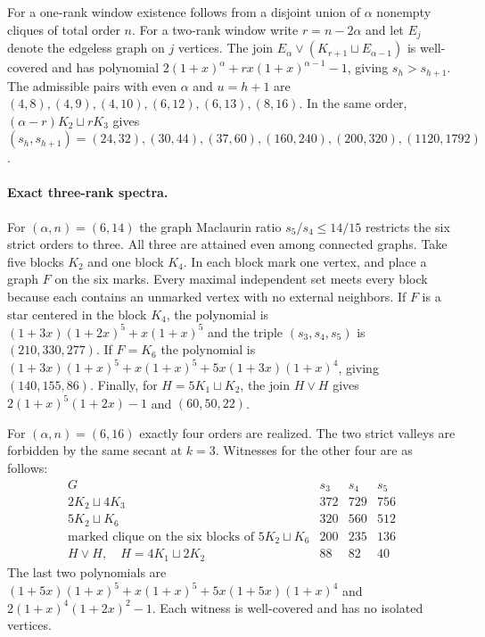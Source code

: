 \documentclass[11pt,a4paper]{article}
\theoremstyle{remark}\newtheorem{remark}[theorem]{Remark}
\numberwithin{equation}{section}
\begin{document}
For a one-rank window existence follows from a disjoint union of $\alpha$
nonempty cliques of total order $n$. For a two-rank window write
$r=n-2\alpha$ and let $E_j$ denote the edgeless graph on $j$ vertices.
The join $E_\alpha\vee (K_{r+1}\sqcup E_{\alpha-1})$ is well-covered and has
polynomial $2(1+x)^\alpha+rx(1+x)^{\alpha-1}-1$, giving $s_h>s_{h+1}$.
The admissible pairs with even $\alpha$ and $u=h+1$ are
$(4,8),(4,9),(4,10),(6,12),(6,13),(8,16)$. In the same order,
$(\alpha-r)K_2\sqcup rK_3$ gives
$(s_h,s_{h+1})=(24,32),(30,44),(37,60),(160,240),(200,320),(1120,1792)$.

\paragraph{Exact three-rank spectra.}
For $(\alpha,n)=(6,14)$ the graph Maclaurin ratio
$s_5/s_4\le14/15$ restricts the six strict orders to three. All three
are attained even among connected graphs. Take five blocks $K_2$ and one
block $K_4$. In each block mark one vertex, and place a graph $F$ on the six
marks. Every maximal independent set meets every block because each contains
an unmarked vertex with no external neighbors. If $F$ is a star centered in
the block $K_4$, the polynomial is
$(1+3x)(1+2x)^5+x(1+x)^5$ and the triple $(s_3,s_4,s_5)$ is $(210,330,277)$.
If $F=K_6$ the polynomial is
$(1+3x)(1+x)^5+x(1+x)^5+5x(1+3x)(1+x)^4$, giving $(140,155,86)$.
Finally, for $H=5K_1\sqcup K_2$, the join $H\vee H$ gives
$2(1+x)^5(1+2x)-1$ and $(60,50,22)$.

For $(\alpha,n)=(6,16)$ exactly four orders are realized. The
two strict valleys are forbidden by the same secant at $k=3$. Witnesses
for the other four are as follows:
\[
\begin{array}{lrrr}
G &s_3&s_4&s_5\\
2K_2\sqcup4K_3 &372&729&756\\
5K_2\sqcup K_6 &320&560&512\\
\text{marked clique on the six blocks of }5K_2\sqcup K_6 &200&235&136\\
H\vee H,\quad H=4K_1\sqcup2K_2 &88&82&40
\end{array}
\]
The last two polynomials are
$(1+5x)(1+x)^5+x(1+x)^5+5x(1+5x)(1+x)^4$ and
$2(1+x)^4(1+2x)^2-1$. Each witness is well-covered and has no isolated vertices.
\end{document}
